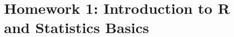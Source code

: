 \documentclass{article}\usepackage[]{graphicx}\usepackage[]{color}
\newcommand{\hlstd}[1]{\textcolor[rgb]{0.345,0.345,0.345}{#1}}%
\renewcommand{\hlstd}[1]{\textcolor[rgb]{0.387,0.581,0.148}{\texttt{#1}}}%
\begin{document}
\section*{Homework 1: Introduction to R and Statistics Basics}


%
\end{document}
